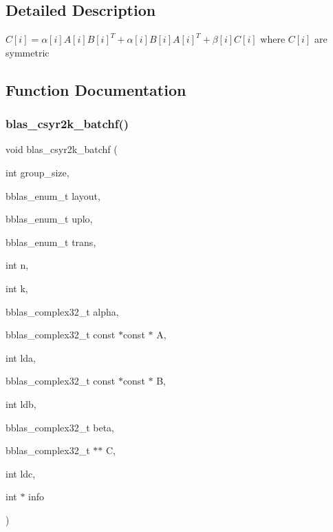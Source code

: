 \subsection{Detailed Description}
$ C[i] = \alpha[i] A[i] B[i]^T + \alpha[i] B[i] A[i]^T + \beta[i] C[i] $ where $ C[i] $ are symmetric 



\subsection{Function Documentation}
\mbox{\label{group__syr2k__batchf_ga33099f6c30809ceab9949f8d8b49ba0d}} 
\subsubsection{\texorpdfstring{blas\+\_\+csyr2k\+\_\+batchf()}{blas\_csyr2k\_batchf()}}
{\footnotesize\ttfamily void blas\+\_\+csyr2k\+\_\+batchf (\begin{DoxyParamCaption}\item[{int}]{group\+\_\+size,  }\item[{bblas\+\_\+enum\+\_\+t}]{layout,  }\item[{bblas\+\_\+enum\+\_\+t}]{uplo,  }\item[{bblas\+\_\+enum\+\_\+t}]{trans,  }\item[{int}]{n,  }\item[{int}]{k,  }\item[{bblas\+\_\+complex32\+\_\+t}]{alpha,  }\item[{bblas\+\_\+complex32\+\_\+t const $\ast$const $\ast$}]{A,  }\item[{int}]{lda,  }\item[{bblas\+\_\+complex32\+\_\+t const $\ast$const $\ast$}]{B,  }\item[{int}]{ldb,  }\item[{bblas\+\_\+complex32\+\_\+t}]{beta,  }\item[{bblas\+\_\+complex32\+\_\+t $\ast$$\ast$}]{C,  }\item[{int}]{ldc,  }\item[{int $\ast$}]{info }\end{DoxyParamCaption})}


